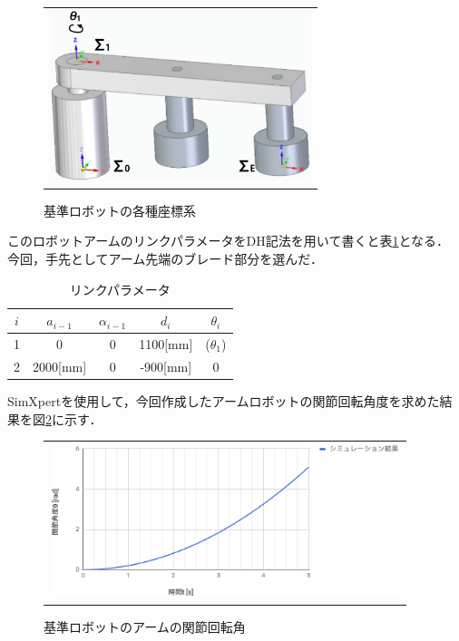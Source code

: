 \begin{figure}[htbp]
  \begin{center}
    \begin{tabular}{c}
      \includegraphics[height=5.0cm]{img/eps/basis-dh.eps}
    \end{tabular}
    \caption{基準ロボットの各種座標系}
    \label{basis-tesaki}
  \end{center}
\end{figure}

このロボットアームのリンクパラメータをDH記法を用いて書くと表\ref{basis-dh-link}となる．
今回，手先としてアーム先端のブレード部分を選んだ．

\begin{table}[htb]
\caption[]{リンクパラメータ}
  \begin{center}
    \begin{tabular}{|c|c|c|c|c|} \hline
      $i$ & $a_{i-1}$ & $\alpha_{i-1}$ & $d_i$ & $\theta_i$\\ \hline \hline
      1 & 0 & 0 & 1100[mm] & ($\theta_1$) \\ \hline
      2 & 2000[mm] & 0 & -900[mm] & 0 \\ \hline
    \end{tabular}
    \label{basis-dh-link}
  \end{center}
\end{table}

SimXpertを使用して，今回作成したアームロボットの関節回転角度を求めた結果を図\ref{basis-kaiten}に示す．

\begin{figure}[htbp]
  \begin{center}
    \begin{tabular}{c}
      \includegraphics[height=4.5cm]{img/eps/basis-kaiten2.eps}
    \end{tabular}
    \caption{基準ロボットのアームの関節回転角}
    \label{basis-kaiten}
  \end{center}
\end{figure}

